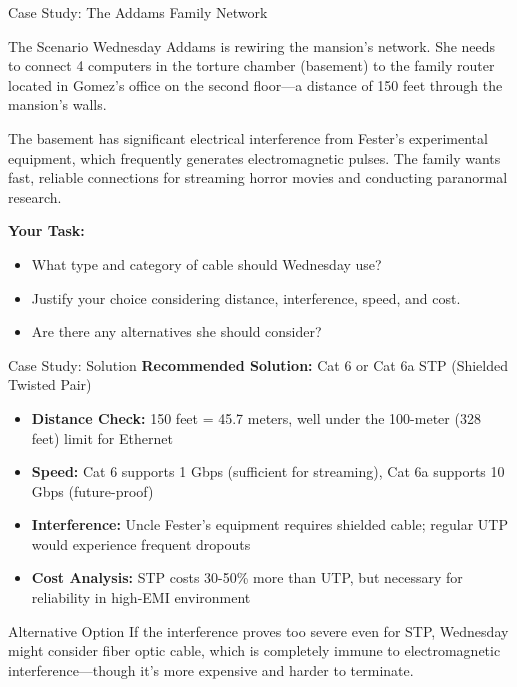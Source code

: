 \documentclass[aspectratio=169]{beamer}
\begin{document}
\begin{frame}{Case Study: The Addams Family Network}
    \begin{block}{The Scenario}
        Wednesday Addams is rewiring the mansion's network. She needs to connect 4 computers in the torture chamber (basement) to the family router located in Gomez's office on the second floor---a distance of 150 feet through the mansion's walls.
        
        \vspace{0.3cm}
        The basement has significant electrical interference from Fester's experimental equipment, which frequently generates electromagnetic pulses. The family wants fast, reliable connections for streaming horror movies and conducting paranormal research.
    \end{block}
    
    \vspace{0.5cm}
    \textbf{Your Task:}
    \begin{itemize}
        \item What type and category of cable should Wednesday use?
        \item Justify your choice considering distance, interference, speed, and cost.
        \item Are there any alternatives she should consider?
    \end{itemize}
\end{frame}

\begin{frame}{Case Study: Solution}
    \textbf{Recommended Solution:} Cat 6 or Cat 6a STP (Shielded Twisted Pair)
    
    \vspace{0.3cm}
    \begin{itemize}
        \item \textbf{Distance Check:} 150 feet = 45.7 meters, well under the 100-meter (328 feet) limit for Ethernet {\color{networkgreen}\checkmark}
        \item \textbf{Speed:} Cat 6 supports 1 Gbps (sufficient for streaming), Cat 6a supports 10 Gbps (future-proof) {\color{networkgreen}\checkmark}
        \item \textbf{Interference:} Uncle Fester's equipment requires shielded cable; regular UTP would experience frequent dropouts {\color{networkgreen}\checkmark}
        \item \textbf{Cost Analysis:} STP costs 30-50\% more than UTP, but necessary for reliability in high-EMI environment
    \end{itemize}
    
    \vspace{0.3cm}
    \begin{alertblock}{Alternative Option}
        If the interference proves too severe even for STP, Wednesday might consider fiber optic cable, which is completely immune to electromagnetic interference---though it's more expensive and harder to terminate.
    \end{alertblock}
\end{frame}
\end{document}
